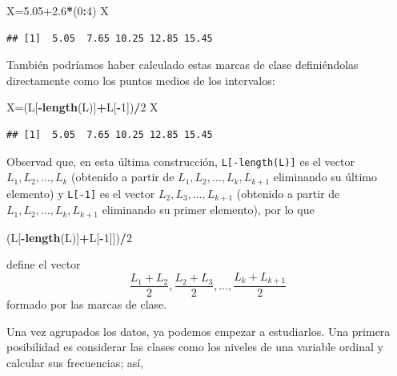 \documentclass[]{book}
\newenvironment{Shaded}{\begin{snugshade}}{\end{snugshade}}
\newcommand{\DecValTok}[1]{\textcolor[rgb]{0.00,0.00,0.81}{#1}}
\newcommand{\FloatTok}[1]{\textcolor[rgb]{0.00,0.00,0.81}{#1}}
\newcommand{\KeywordTok}[1]{\textcolor[rgb]{0.13,0.29,0.53}{\textbf{#1}}}
\newcommand{\NormalTok}[1]{#1}
\newcommand{\OperatorTok}[1]{\textcolor[rgb]{0.81,0.36,0.00}{\textbf{#1}}}
\theoremstyle{definition}
\theoremstyle{definition}
\theoremstyle{definition}
\theoremstyle{remark}
\begin{document}
\begin{Shaded}
\begin{Highlighting}[]
\NormalTok{X=}\FloatTok{5.05+2.6}\OperatorTok{*}\NormalTok{(}\DecValTok{0}\OperatorTok{:}\DecValTok{4}\NormalTok{)}
\NormalTok{X}
\end{Highlighting}
\end{Shaded}

\begin{verbatim}
## [1]  5.05  7.65 10.25 12.85 15.45
\end{verbatim}

También podríamos haber calculado estas marcas de clase definiéndolas directamente como los puntos medios de los intervalos:

\begin{Shaded}
\begin{Highlighting}[]
\NormalTok{X=(L[}\OperatorTok{-}\KeywordTok{length}\NormalTok{(L)]}\OperatorTok{+}\NormalTok{L[}\OperatorTok{-}\DecValTok{1}\NormalTok{])}\OperatorTok{/}\DecValTok{2}
\NormalTok{X}
\end{Highlighting}
\end{Shaded}

\begin{verbatim}
## [1]  5.05  7.65 10.25 12.85 15.45
\end{verbatim}

Observad que, en esta última construcción, \texttt{L{[}-length(L){]}} es el vector \(L_1,L_2,\ldots,L_k\) (obtenido a partir de \(L_1,L_2,\ldots,L_k,L_{k+1}\) eliminando su último elemento) y
\texttt{L{[}-1{]}} es el vector \(L_2,L_3,\ldots,L_{k+1}\) (obtenido a partir de \(L_1,L_2,\ldots,L_k,L_{k+1}\) eliminando su primer elemento), por lo que

\begin{Shaded}
\begin{Highlighting}[]
\NormalTok{(L[}\OperatorTok{-}\KeywordTok{length}\NormalTok{(L)]}\OperatorTok{+}\NormalTok{L[}\OperatorTok{-}\DecValTok{1}\NormalTok{]])}\OperatorTok{/}\DecValTok{2}
\end{Highlighting}
\end{Shaded}

define el vector
\[
\frac{L_1+L_2}{2},\frac{L_2+L_3}{2},\ldots,\frac{L_k+L_{k+1}}{2}
\]
formado por las marcas de clase.

Una vez agrupados los datos, ya podemos empezar a estudiarlos. Una primera posibilidad es considerar las clases como los niveles de una variable ordinal y calcular sus frecuencias; así,
\end{document}
